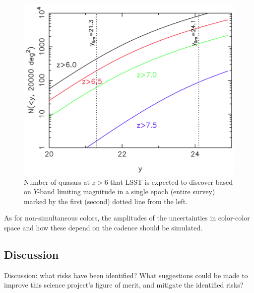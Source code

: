 \begin{figure}
\centering\includegraphics[width=0.9\linewidth]{figs/agn/zgt6_figure_AAS_2013.png}
\caption{Number of quasars at $z>6$ that LSST is expected to discover
based on $Y$-band limiting magnitude in a single epoch (entire survey)
marked by the first (second) dotted line from the left.}
\label{fig:zgt6}
\end{figure}

As for non-simultaneous colors, the amplitudes of the uncertainties in color-color
space and how these depend on the cadence should be simulated.


\subsection{Discussion}
\label{sec:\secname:discussion}

Discussion: what risks have been identified? What suggestions could be
made to improve this science project's figure of merit, and mitigate
the identified risks?



\navigationbar
